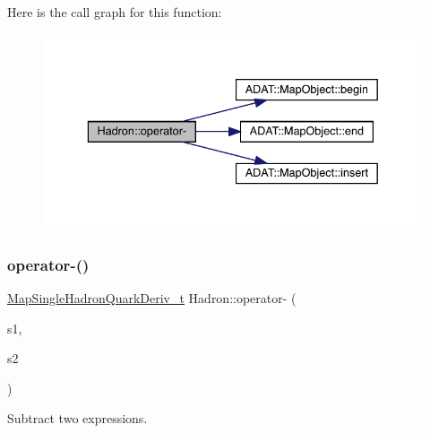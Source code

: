 Here is the call graph for this function\+:\nopagebreak
\begin{figure}[H]
\begin{center}
\leavevmode
\includegraphics[width=336pt]{d1/daf/namespaceHadron_a3420e25a6674cbce229ba6b98f1fa85a_cgraph}
\end{center}
\end{figure}
\mbox{\label{namespaceHadron_a064800b32b071a140c16ef8416cfa165}} 
\subsubsection{\texorpdfstring{operator-\/()}{operator-()}\hspace{0.1cm}{\footnotesize\ttfamily [4/6]}}
{\footnotesize\ttfamily \mbox{\hyperlink{namespaceHadron_aa588220689caea8a6aad4d0296526e6b}{Map\+Single\+Hadron\+Quark\+Deriv\+\_\+t}} Hadron\+::operator-\/ (\begin{DoxyParamCaption}\item[{const \mbox{\hyperlink{namespaceHadron_aa588220689caea8a6aad4d0296526e6b}{Map\+Single\+Hadron\+Quark\+Deriv\+\_\+t}} \&}]{s1,  }\item[{const \mbox{\hyperlink{namespaceHadron_aa588220689caea8a6aad4d0296526e6b}{Map\+Single\+Hadron\+Quark\+Deriv\+\_\+t}} \&}]{s2 }\end{DoxyParamCaption})}



Subtract two expressions. 

\mbox{\label{namespaceHadron_a2cee38a50a5e1ed5fbff1d9e4df08bdd}} 
